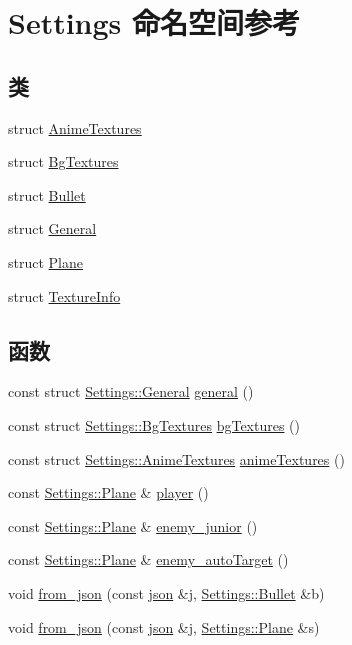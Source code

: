 \hypertarget{namespace_settings}{}\section{Settings 命名空间参考}
\label{namespace_settings}
\subsection*{类}
\begin{DoxyCompactItemize}
\item 
struct \hyperlink{struct_settings_1_1_anime_textures}{Anime\+Textures}
\item 
struct \hyperlink{struct_settings_1_1_bg_textures}{Bg\+Textures}
\item 
struct \hyperlink{struct_settings_1_1_bullet}{Bullet}
\item 
struct \hyperlink{struct_settings_1_1_general}{General}
\item 
struct \hyperlink{struct_settings_1_1_plane}{Plane}
\item 
struct \hyperlink{struct_settings_1_1_texture_info}{Texture\+Info}
\end{DoxyCompactItemize}
\subsection*{函数}
\begin{DoxyCompactItemize}
\item 
const struct \hyperlink{struct_settings_1_1_general}{Settings\+::\+General} \hyperlink{namespace_settings_a8d5eb32bea233e3b9ae9ce6e29b8d8bb}{general} ()
\item 
const struct \hyperlink{struct_settings_1_1_bg_textures}{Settings\+::\+Bg\+Textures} \hyperlink{namespace_settings_a8bae923ac0d881b72bbec4f50730ec72}{bg\+Textures} ()
\item 
const struct \hyperlink{struct_settings_1_1_anime_textures}{Settings\+::\+Anime\+Textures} \hyperlink{namespace_settings_a106c90d315148ccd78a2d961dae148a8}{anime\+Textures} ()
\item 
const \hyperlink{struct_settings_1_1_plane}{Settings\+::\+Plane} \& \hyperlink{namespace_settings_ab78c6dca0d1b2fc76eae348e81a3eed7}{player} ()
\item 
const \hyperlink{struct_settings_1_1_plane}{Settings\+::\+Plane} \& \hyperlink{namespace_settings_a5d571065d327daba740814f8e90261f5}{enemy\+\_\+junior} ()
\item 
const \hyperlink{struct_settings_1_1_plane}{Settings\+::\+Plane} \& \hyperlink{namespace_settings_a77e282eadc82f97cb15c2c3eef3c535b}{enemy\+\_\+auto\+Target} ()
\item 
void \hyperlink{namespace_settings_a42e5acb521fa66b1f2311a896df95a98}{from\+\_\+json} (const \hyperlink{_resources_loader_8cpp_ab701e3ac61a85b337ec5c1abaad6742d}{json} \&j, \hyperlink{struct_settings_1_1_bullet}{Settings\+::\+Bullet} \&b)
\item 
void \hyperlink{namespace_settings_aaba1604e449415b4bcbbb0a6e50a0ac9}{from\+\_\+json} (const \hyperlink{_resources_loader_8cpp_ab701e3ac61a85b337ec5c1abaad6742d}{json} \&j, \hyperlink{struct_settings_1_1_plane}{Settings\+::\+Plane} \&s)
\end{DoxyCompactItemize}
